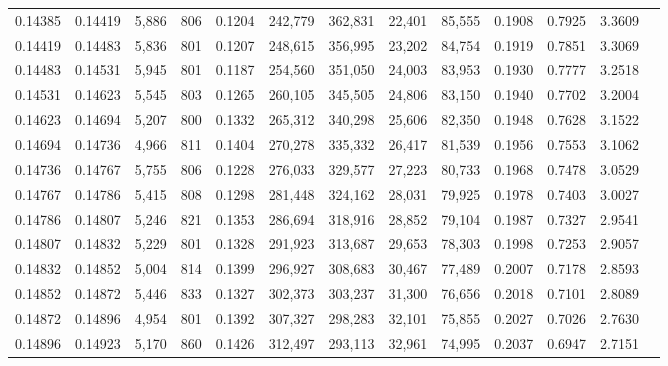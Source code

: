\begin{tabular}{rrrrrrrrrrrrr}
0.14385 & 0.14419 &  5,886 & 806 &                                     0.1204 & 242,779 & 362,831 &  22,401 &  85,555 & 0.1908 & 0.7925 & 3.3609 \\
0.14419 & 0.14483 &  5,836 & 801 &                                     0.1207 & 248,615 & 356,995 &  23,202 &  84,754 & 0.1919 & 0.7851 & 3.3069 \\
0.14483 & 0.14531 &  5,945 & 801 &                                     0.1187 & 254,560 & 351,050 &  24,003 &  83,953 & 0.1930 & 0.7777 & 3.2518 \\
0.14531 & 0.14623 &  5,545 & 803 &                                     0.1265 & 260,105 & 345,505 &  24,806 &  83,150 & 0.1940 & 0.7702 & 3.2004 \\
0.14623 & 0.14694 &  5,207 & 800 &                                     0.1332 & 265,312 & 340,298 &  25,606 &  82,350 & 0.1948 & 0.7628 & 3.1522 \\
0.14694 & 0.14736 &  4,966 & 811 &                                     0.1404 & 270,278 & 335,332 &  26,417 &  81,539 & 0.1956 & 0.7553 & 3.1062 \\
0.14736 & 0.14767 &  5,755 & 806 &                                     0.1228 & 276,033 & 329,577 &  27,223 &  80,733 & 0.1968 & 0.7478 & 3.0529 \\
0.14767 & 0.14786 &  5,415 & 808 &                                     0.1298 & 281,448 & 324,162 &  28,031 &  79,925 & 0.1978 & 0.7403 & 3.0027 \\
0.14786 & 0.14807 &  5,246 & 821 &                                     0.1353 & 286,694 & 318,916 &  28,852 &  79,104 & 0.1987 & 0.7327 & 2.9541 \\
0.14807 & 0.14832 &  5,229 & 801 &                                     0.1328 & 291,923 & 313,687 &  29,653 &  78,303 & 0.1998 & 0.7253 & 2.9057 \\
0.14832 & 0.14852 &  5,004 & 814 &                                     0.1399 & 296,927 & 308,683 &  30,467 &  77,489 & 0.2007 & 0.7178 & 2.8593 \\
0.14852 & 0.14872 &  5,446 & 833 &                                     0.1327 & 302,373 & 303,237 &  31,300 &  76,656 & 0.2018 & 0.7101 & 2.8089 \\
0.14872 & 0.14896 &  4,954 & 801 &                                     0.1392 & 307,327 & 298,283 &  32,101 &  75,855 & 0.2027 & 0.7026 & 2.7630 \\
0.14896 & 0.14923 &  5,170 & 860 &                                     0.1426 & 312,497 & 293,113 &  32,961 &  74,995 & 0.2037 & 0.6947 & 2.7151 \\

\end{tabular}
